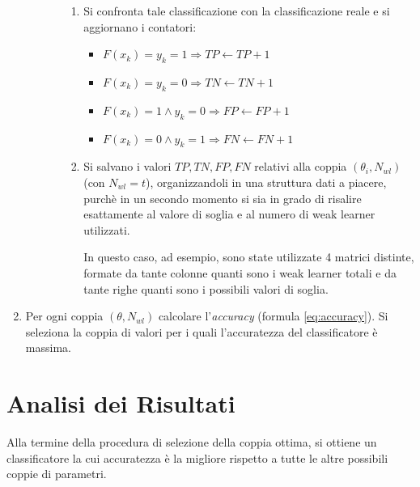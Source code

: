 \begin{enumerate}
\begin{enumerate}
\begin{enumerate}
\begin{enumerate}
                                \item Si confronta tale classificazione con la classificazione reale e si aggiornano i contatori:
                                    \begin{itemize}
                                        \item $F(x_k) = y_k = 1 
                                        \Longrightarrow TP \leftarrow TP + 1$
                                        \item $F(x_k) = y_k = 0
                                        \Longrightarrow TN \leftarrow TN + 1$
                                        \item $F(x_k) = 1 \wedge y_k = 0 
                                        \Longrightarrow FP \leftarrow FP + 1$
                                        \item $F(x_k) = 0 \wedge y_k = 1 
                                        \Longrightarrow FN \leftarrow FN + 1$
                                    \end{itemize}

                                \item Si salvano i valori $TP, TN, FP, FN$ relativi alla coppia $(\theta_i, N_{wl})$ (con $N_{wl} = t$), organizzandoli in una struttura dati a piacere, purchè in un secondo momento si sia in grado di risalire esattamente al valore di soglia e al numero di weak learner utilizzati.

                                In questo caso, ad esempio, sono state utilizzate 4 matrici distinte, formate da tante colonne quanti sono i weak learner totali e da tante righe quanti sono i possibili valori di soglia.
                            \end{enumerate}
                    \end{enumerate}
                \end{enumerate}

                \item Per ogni coppia $(\theta, N_{wl})$ calcolare l'\emph{accuracy} (formula \ref{eq:accuracy}).
                Si seleziona la coppia di valori per i quali l'accuratezza del classificatore è massima.
            \end{enumerate}


    \section{Analisi dei Risultati} %
    \label{sec:analisi_dei_risultati}
        Alla termine della procedura di selezione della coppia ottima, si ottiene un classificatore la cui accuratezza è la migliore rispetto a tutte le altre possibili coppie di parametri.

